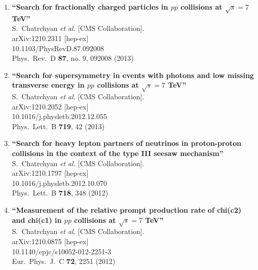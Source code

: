 \documentclass{article}
\begin{document}
\begin{enumerate}
\item%
{\bf ``Search for fractionally charged particles in $pp$ collisions at $\sqrt{s}=7$ TeV''}
  \\{}S.~Chatrchyan {\it et al.}  [CMS Collaboration].
  \\{}arXiv:1210.2311 [hep-ex]
    \\{}10.1103/PhysRevD.87.092008
\\{}Phys.\ Rev.\ D {\bf 87}, no. 9, 092008 (2013) %


\item%
{\bf ``Search for supersymmetry in events with photons and low missing transverse energy in $pp$ collisions at $\sqrt{s}=7$ TeV''}
  \\{}S.~Chatrchyan {\it et al.}  [CMS Collaboration].
  \\{}arXiv:1210.2052 [hep-ex]
    \\{}10.1016/j.physletb.2012.12.055
\\{}Phys.\ Lett.\ B {\bf 719}, 42 (2013) %


\item%
{\bf ``Search for heavy lepton partners of neutrinos in proton-proton collisions in the context of the type III seesaw mechanism''}
  \\{}S.~Chatrchyan {\it et al.}  [CMS Collaboration].
  \\{}arXiv:1210.1797 [hep-ex]
    \\{}10.1016/j.physletb.2012.10.070
\\{}Phys.\ Lett.\ B {\bf 718}, 348 (2012) %


\item%
{\bf ``Measurement of the relative prompt production rate of chi(c2) and chi(c1) in $pp$ collisions at $\sqrt{s}=7$ TeV''}
  \\{}S.~Chatrchyan {\it et al.}  [CMS Collaboration].
  \\{}arXiv:1210.0875 [hep-ex]
    \\{}10.1140/epjc/s10052-012-2251-3
\\{}Eur.\ Phys.\ J.\ C {\bf 72}, 2251 (2012) %



\end{enumerate}
\end{document}
